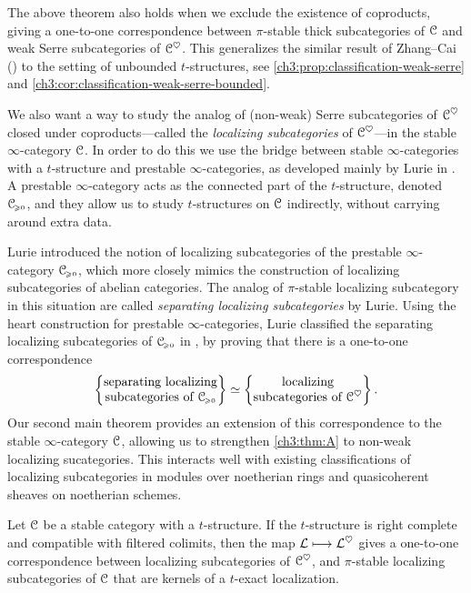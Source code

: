 The above theorem also holds when we exclude the existence of coproducts, giving a one-to-one correspondence between $\pi$-stable thick subcategories of $\EuScript{C}$ and weak Serre subcategories of $\EuScript{C}^\heartsuit$. This generalizes the similar result of Zhang--Cai (\cite{zhang-cai_2017}) to the setting of unbounded $t$-structures, see \cref{ch3:prop:classification-weak-serre} and \cref{ch3:cor:classification-weak-serre-bounded}. 

We also want a way to study the analog of (non-weak) Serre subcategories of $\EuScript{C}^\heartsuit$ closed under coproducts---called the \emph{localizing subcategories} of $\EuScript{C}^\heartsuit$---in the stable $\infty$-category $\EuScript{C}$. In order to do this we use the bridge between stable $\infty$-categories with a $t$-structure and prestable $\infty$-categories, as developed mainly by Lurie in \cite[App. C]{lurie_SAG}. A prestable $\infty$-category acts as the connected part of the $t$-structure, denoted $\EuScript{C}_{\hspace{-1pt}\scriptscriptstyle\geqslant 0}$, and they allow us to study $t$-structures on $\EuScript{C}$ indirectly, without carrying around extra data. 

Lurie introduced the notion of localizing subcategories of the prestable $\infty$-category $\EuScript{C}_{\hspace{-1pt}\scriptscriptstyle\geqslant 0}$, which more closely mimics the construction of localizing subcategories of abelian categories. The analog of $\pi$-stable localizing subcategory in this situation are called \emph{separating localizing subcategories} by Lurie. Using the heart construction for prestable $\infty$-categories, Lurie classified the separating localizing subcategories of $\EuScript{C}_{\hspace{-1pt}\scriptscriptstyle\geqslant 0}$ in \cite[C.5.2.7]{lurie_SAG}, by proving that there is a one-to-one correspondence
\[\left\{ \begin{matrix} \text{separating localizing}\\ \text{subcategories of }\EuScript{C}_{\hspace{-1pt}\scriptscriptstyle\geqslant 0} \end{matrix} \right\} \simeq \left\{ \begin{matrix} \text{localizing}\\ \text{subcategories of }\EuScript{C}^\heartsuit \end{matrix} \right\}.\]
Our second main theorem provides an extension of this correspondence to the stable $\infty$-category $\EuScript{C}$, allowing us to strengthen \cref{ch3:thm:A} to non-weak localizing sucategories. This interacts well with existing classifications of localizing subcategories in modules over noetherian rings and quasicoherent sheaves on noetherian schemes. 


\begin{introthm}
    \label{ch3:thm:B}
    Let $\EuScript{C}$ be a stable category with a $t$-structure. If the $t$-structure is right complete and compatible with filtered colimits, then the map $\mathcal{L}\longmapsto \mathcal{L}^\heartsuit$ gives a one-to-one correspondence between localizing subcategories of $\EuScript{C}^\heartsuit$, and $\pi$-stable localizing subcategories of $\EuScript{C}$ that are kernels of a $t$-exact localization.
\end{introthm}

